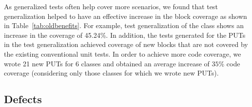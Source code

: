 As generalized tests often help cover more scenarios, we found that
test generalization helped to have an effective increase in the block coverage as shown in Table~\ref{tab:oldbenefits}.
For example, test generalization of the 
class shows an increase in the coverage of 45.24\%.
In addition, the tests generated for the PUTs in the test generalization achieved coverage
of new blocks that are not covered by the existing conventional 
unit tests. In order to achieve more code coverage, we wrote 21 new PUTs for 6 classes and obtained an average increase of $35$\% code coverage (considering only those classes for which we wrote new PUTs).
\subsection{Defects}
\label{sec:defects}

